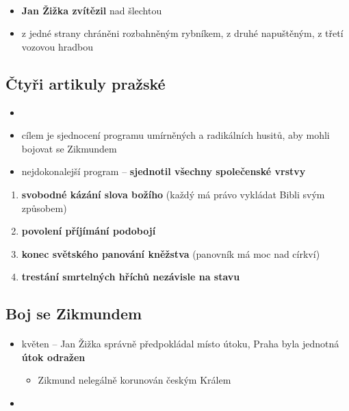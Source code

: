\paragraph{}
\begin{itemize}
\item \textbf{Jan Žižka zvítězil} nad šlechtou
\item z jedné strany chráněni rozbahněným rybníkem, z druhé napuštěným, z třetí vozovou hradbou
\end{itemize}

\subsection{Čtyři artikuly pražské}
\begin{itemize}
\item {}
\item cílem je sjednocení programu umírněných a radikálních husitů, aby mohli bojovat se Zikmundem
\item nejdokonalejší program -- \textbf{sjednotil všechny společenské vrstvy}
\end{itemize}
\begin{enumerate}
\item \textbf{svobodné kázání slova božího} (každý má právo vykládat Bibli svým způsobem)
\item \textbf{povolení příjímání podobojí}
\item \textbf{konec světského panování kněžstva} (panovník má moc nad církví)
\item \textbf{trestání smrtelných hříchů nezávisle na stavu}
\end{enumerate}

\subsection{Boj se Zikmundem}
\paragraph{}
\begin{itemize}
\item květen -- Jan Žižka správně předpokládal místo útoku, Praha byla jednotná \ra\textbf{ útok odražen}
\begin{itemize}
\item Zikmund nelegálně korunován českým Králem
\end{itemize}
\item {}
\end{itemize}

